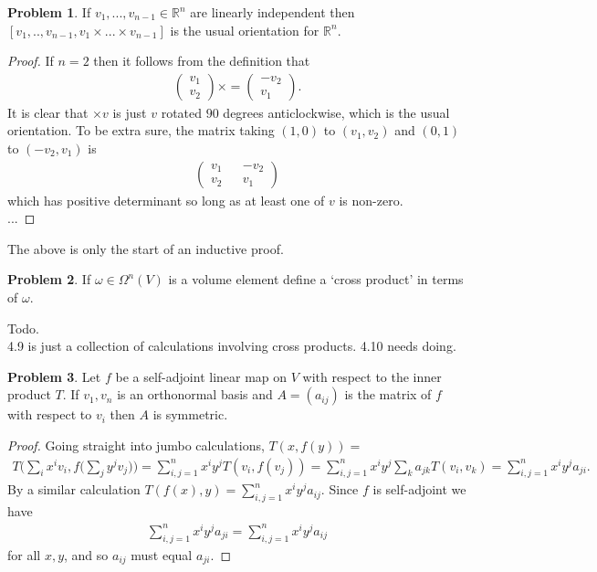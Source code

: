 \documentclass[20pt]{article}
\theoremstyle{plain}
\theoremstyle{definition}
\newtheorem*{problem}{Problem}
\newcommand{\reals}{\mathbb{R}}
\begin{document}
\begin{problem}{4.6}
  If $v_1, ..., v_{n-1} \in \reals^n$ are linearly independent then
  $[v_1, .., v_{n-1}, v_1 \times ... \times v_{n-1}]$ is the usual
  orientation for $\reals^n$.
\end{problem}
\begin{proof}
  If $n=2$ then it follows from the definition that
  \begin{align*}
    \begin{pmatrix}
      v_1 \\ v_2
    \end{pmatrix}
    \times =
    \begin{pmatrix}
      -v_2 \\ v_1
    \end{pmatrix}.
  \end{align*}
  It is clear that $\times v$ is just $v$ rotated $90$ degrees anticlockwise,
  which is the usual orientation.   To be extra sure, the matrix taking
  $(1, 0)$ to $(v_1, v_2)$ and $(0, 1)$ to $(-v_2, v_1)$ is
  \begin{align*}
    \begin{pmatrix}
      v_1 && -v_2 \\ v_2 && v_1
    \end{pmatrix}
  \end{align*}
  which has positive determinant so long as at least one of $v$ is non-zero. \\
  ...
\end{proof}
{\color{Blue}
The above is only the start of an inductive proof.}




\begin{problem}{4.8}
  If $\omega \in \Omega^n(V)$ is a volume element define a `cross product' in terms of $\omega$.
\end{problem}
{\color{Blue} Todo.\\
4.9 is just a collection of calculations involving cross products.
4.10 needs doing.}




\begin{problem}{4.11}
  Let $f$ be a self-adjoint linear map on $V$ with respect to the inner product
  $T$.  If $v_1, v_n$ is an orthonormal basis and $A = (a_{ij})$ is the matrix of
  $f$ with respect to $v_i$ then $A$ is symmetric.
\end{problem}
\begin{proof}
  Going straight into jumbo calculations, $T(x, f(y)) = $
  \begin{align*}
    T \bigg( \sum_i x^iv_i, f \bigg( \sum_j y^jv_j  \bigg) \bigg) =
    \sum_{i,j = 1}^n x^iy^jT(v_i, f(v_j)) =
    \sum_{i,j = 1}^n x^iy^j \sum_k a_{jk} T(v_i, v_k) =
    \sum_{i,j = 1}^n x^iy^ja_{ji}.
  \end{align*}
  By a similar calculation $T(f(x), y) = \sum_{i,j = 1}^n x^iy^ja_{ij}$.
  Since $f$ is self-adjoint we have
  \begin{align*}
    \sum_{i,j = 1}^n x^iy^ja_{ji} = \sum_{i,j = 1}^n x^iy^ja_{ij}
  \end{align*}
  for all $x, y$, and so $a_{ij}$ must equal $a_{ji}.$
\end{proof}
\end{document}
